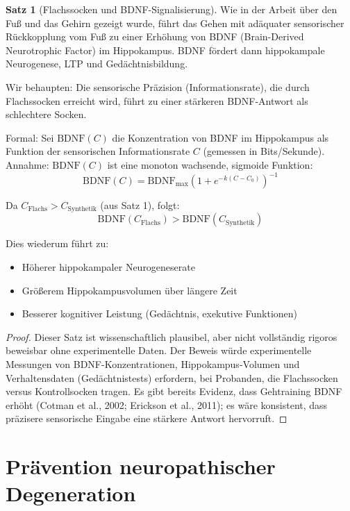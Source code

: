 \documentclass[a4paper,12pt]{article}
\theoremstyle{definition}
\newtheorem{satz}{Satz}
\begin{document}
\begin{satz}[Flachssocken und BDNF-Signalisierung]
Wie in der Arbeit über den Fuß und das Gehirn gezeigt wurde, führt das Gehen mit adäquater sensorischer Rückkopplung vom Fuß zu einer Erhöhung von BDNF (Brain-Derived Neurotrophic Factor) im Hippokampus. BDNF fördert dann hippokampale Neurogenese, LTP und Gedächtnisbildung.

Wir behaupten: Die sensorische Präzision (Informationsrate), die durch Flachssocken erreicht wird, führt zu einer stärkeren BDNF-Antwort als schlechtere Socken.

Formal: Sei $\text{BDNF}(C)$ die Konzentration von BDNF im Hippokampus als Funktion der sensorischen Informationsrate $C$ (gemessen in Bits/Sekunde). Annahme: $\text{BDNF}(C)$ ist eine monoton wachsende, sigmoide Funktion:
\[
\text{BDNF}(C) = \text{BDNF}_{\max} \left( 1 + e^{-k(C - C_0)} \right)^{-1}
\]

Da $C_{\text{Flachs}} > C_{\text{Synthetik}}$ (aus Satz 1), folgt:
\[
\text{BDNF}(C_{\text{Flachs}}) > \text{BDNF}(C_{\text{Synthetik}})
\]

Dies wiederum führt zu:
\begin{itemize}
    \item[-] Höherer hippokampaler Neurogeneserate
    \item[-] Größerem Hippokampusvolumen über längere Zeit
    \item[-] Besserer kognitiver Leistung (Gedächtnis, exekutive Funktionen)
\end{itemize}
\end{satz}

\begin{proof}
Dieser Satz ist wissenschaftlich plausibel, aber nicht vollständig rigoros beweisbar ohne experimentelle Daten. Der Beweis würde experimentelle Messungen von BDNF-Konzentrationen, Hippokampus-Volumen und Verhaltensdaten (Gedächtnistests) erfordern, bei Probanden, die Flachssocken versus Kontrollsocken tragen. Es gibt bereits Evidenz, dass Gehtraining BDNF erhöht (Cotman et al., 2002; Erickson et al., 2011); es wäre konsistent, dass präzisere sensorische Eingabe eine stärkere Antwort hervorruft.
\end{proof}

\section{Prävention neuropathischer Degeneration}
\end{document}
